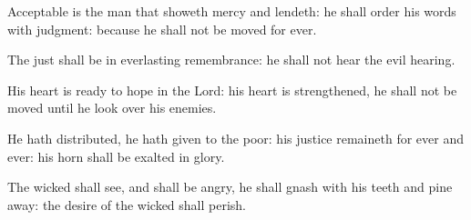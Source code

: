 \documentclass[letterpaper,12pt]{article} %
\begin{document}
\begin{parcolumns}[rulebetween]{2}
{\begin{psalmverses}[0]
\item Acceptable is the man that showeth mercy and lendeth: he shall order his words with judgment: because he shall not be moved for ever.
\item The just shall be in everlasting remembrance: he shall not hear the evil hearing.
\item His heart is ready to hope in the Lord: his heart is strengthened, he shall not be moved until he look over his enemies.
\item He hath distributed, he hath given to the poor: his justice remaineth for ever and ever: his horn shall be exalted in glory.
\item The wicked shall see, and shall be angry, he shall gnash with his teeth and pine away: the desire of the wicked shall perish.
\end{psalmverses}
}
\end{parcolumns}
\pagebreak
\end{document}

